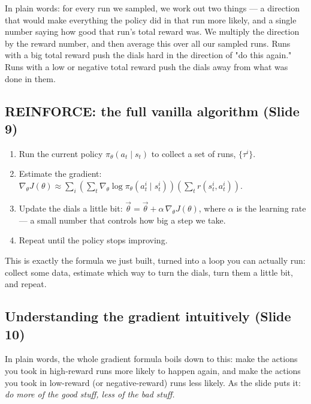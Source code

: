 \documentclass[11pt]{article}
\begin{document}
In plain words: for every run we sampled, we work out two things --- a direction that would make everything the policy did in that run more likely, and a single number saying how good that run's total reward was. We multiply the direction by the reward number, and then average this over all our sampled runs. Runs with a big total reward push the dials hard in the direction of "do this again." Runs with a low or negative total reward push the dials away from what was done in them.

\subsection{REINFORCE: the full vanilla algorithm (Slide 9)}
\begin{enumerate}[leftmargin=*]
  \item Run the current policy $\pi_\theta(a_t\mid s_t)$ to collect a set of runs, $\{\tau^i\}$.
  \item Estimate the gradient: $\nabla_\theta J(\theta) \approx \sum_i\left(\sum_t \nabla_\theta\log\pi_\theta(a^i_t\mid s^i_t)\right)\left(\sum_t r(s^i_t,a^i_t)\right)$.
  \item Update the dials a little bit: $\vec\theta = \vec\theta + \alpha\,\nabla_\theta J(\theta)$, where $\alpha$ is the learning rate --- a small number that controls how big a step we take.
  \item Repeat until the policy stops improving.
\end{enumerate}
This is exactly the formula we just built, turned into a loop you can actually run: collect some data, estimate which way to turn the dials, turn them a little bit, and repeat.

\subsection{Understanding the gradient intuitively (Slide 10)}
In plain words, the whole gradient formula boils down to this: make the actions you took in high-reward runs more likely to happen again, and make the actions you took in low-reward (or negative-reward) runs less likely. As the slide puts it: \emph{do more of the good stuff, less of the bad stuff.}
\end{document}
